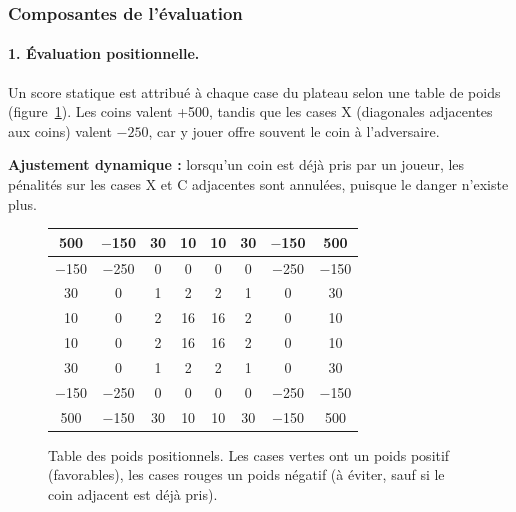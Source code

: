 \documentclass[12pt, a4paper]{article}
\begin{document}
\subsubsection{Composantes de l'évaluation}

\paragraph{1. Évaluation positionnelle.}
Un score statique est attribué à chaque case du plateau selon une table de poids (figure~\ref{fig:poids}). Les coins valent +500, tandis que les cases X (diagonales adjacentes aux coins) valent $-250$, car y jouer offre souvent le coin à l'adversaire.

\textbf{Ajustement dynamique :} lorsqu'un coin est déjà pris par un joueur, les pénalités sur les cases X et C adjacentes sont annulées, puisque le danger n'existe plus.

\begin{figure}[H]
\centering
\begin{tabular}{|c|c|c|c|c|c|c|c|}
\hline
\cellcolor{green!30}500 & \cellcolor{red!25}$-$150 & \cellcolor{green!30}30 & \cellcolor{green!30}10 & \cellcolor{green!30}10 & \cellcolor{green!30}30 & \cellcolor{red!25}$-$150 & \cellcolor{green!30}500 \\
\hline
\cellcolor{red!25}$-$150 & \cellcolor{red!25}$-$250 & 0 & 0 & 0 & 0 & \cellcolor{red!25}$-$250 & \cellcolor{red!25}$-$150 \\
\hline
\cellcolor{green!30}30 & 0 & \cellcolor{green!30}1 & \cellcolor{green!30}2 & \cellcolor{green!30}2 & \cellcolor{green!30}1 & 0 & \cellcolor{green!30}30 \\
\hline
\cellcolor{green!30}10 & 0 & \cellcolor{green!30}2 & \cellcolor{green!30}16 & \cellcolor{green!30}16 & \cellcolor{green!30}2 & 0 & \cellcolor{green!30}10 \\
\hline
\cellcolor{green!30}10 & 0 & \cellcolor{green!30}2 & \cellcolor{green!30}16 & \cellcolor{green!30}16 & \cellcolor{green!30}2 & 0 & \cellcolor{green!30}10 \\
\hline
\cellcolor{green!30}30 & 0 & \cellcolor{green!30}1 & \cellcolor{green!30}2 & \cellcolor{green!30}2 & \cellcolor{green!30}1 & 0 & \cellcolor{green!30}30 \\
\hline
\cellcolor{red!25}$-$150 & \cellcolor{red!25}$-$250 & 0 & 0 & 0 & 0 & \cellcolor{red!25}$-$250 & \cellcolor{red!25}$-$150 \\
\hline
\cellcolor{green!30}500 & \cellcolor{red!25}$-$150 & \cellcolor{green!30}30 & \cellcolor{green!30}10 & \cellcolor{green!30}10 & \cellcolor{green!30}30 & \cellcolor{red!25}$-$150 & \cellcolor{green!30}500 \\
\hline
\end{tabular}
\caption{Table des poids positionnels. Les cases vertes ont un poids positif (favorables), les cases rouges un poids négatif (à éviter, sauf si le coin adjacent est déjà pris).}
\label{fig:poids}
\end{figure}
\end{document}
